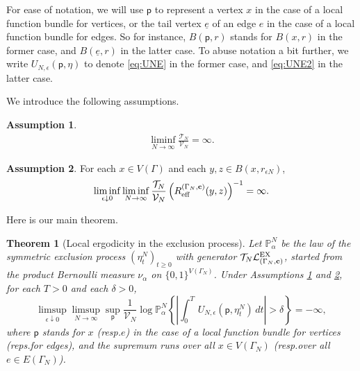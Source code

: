 \documentclass[11pt]{amsart}
\theoremstyle{plain}
\newtheorem{theorem}{Theorem}
\theoremstyle{definition}
\newtheorem{assumption}{Assumption}
\theoremstyle{remark}
\begin{document}
For ease of notation, we will use ${\mathsf{p}}$ to represent a vertex $x$ in the case of a local function bundle for vertices, or the tail vertex $\underline{e}$ of an edge $e$ in the case of a local function bundle for edges. So for instance, $B({\mathsf{p}}, r)$ stands for $B(x,r)$ in the former case, and $B(\underline{e},r)$ in the latter case. To abuse notation a bit further, we write $U_{N,\epsilon}({\mathsf{p}}, \eta)$  to denote \eqref{eq:UNE} in the former case, and \eqref{eq:UNE2} in the latter case.

We introduce the following assumptions.

\begin{assumption}
\label{ass:1}
\begin{align}
\liminf_{N\to\infty} \frac{\mathcal{T}_N}{\mathcal{V}_N} = \infty.
\end{align}
\end{assumption}

\begin{assumption}
\label{ass:2}
For each $x\in V(\Gamma)$ and each $y,z \in B(x,r_{\epsilon N})$,
\begin{align}
\label{eq:ass2}
\liminf_{\epsilon\downarrow 0} \liminf_{N\to\infty} \frac{\mathcal{T}_N}{\mathcal{V}_N} \left(R_{\rm eff}^{(\Gamma_N,{\bf c})}(y,z)\right)^{-1} = \infty.
\end{align}
\end{assumption}

Here is our main theorem.

\begin{theorem}[Local ergodicity in the exclusion process]
\label{thm:localrep}
Let $\mathbb{P}^N_{\alpha}$ be the law of the symmetric exclusion process $(\eta_t^N)_{t\geq 0}$ with generator $\mathcal{T}_N \mathcal{L}^{\rm EX}_{(\Gamma_N, {\bf c})}$, started from the product Bernoulli measure $\nu_\alpha$ on $\{0,1\}^{V(\Gamma_N)}$. Under Assumptions \ref{ass:1} and \ref{ass:2}, for each $T>0$ and each $\delta>0$,
\begin{equation}
\label{supexp}
\limsup_{\epsilon\downarrow 0} \limsup_{N\to\infty} \sup_{\mathsf{p}} \frac{1}{\mathcal{V}_N} \log \mathbb{P}^N_{\alpha} \left\{ \left|\int_0^T\, U_{N,\epsilon}({\mathsf{p}},\eta^N_t)\,dt\right|>\delta\right\} = -\infty,
\end{equation}
where ${\mathsf{p}}$ stands for $x$ (resp.\@ $e$) in the case of a local function bundle for vertices (reps.\@ for edges), and the supremum runs over all $x\in V(\Gamma_N)$ (resp.\@ over all $e\in E(\Gamma_N)$).
\end{theorem}
\end{document}

